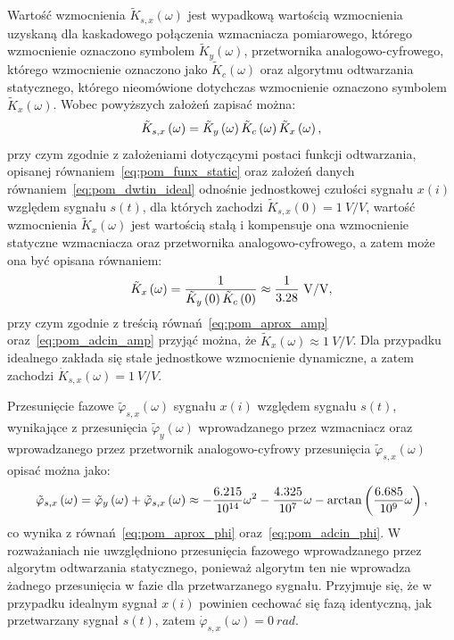 Wartość wzmocnienia $\tilde{K}_{s,x}(\omega)$ jest wypadkową wartością wzmocnienia uzyskaną dla kaskadowego połączenia wzmacniacza pomiarowego, którego wzmocnienie oznaczono symbolem $\tilde{K}_{y}(\omega)$, przetwornika analogowo-cyfrowego, którego wzmocnienie oznaczono jako $\tilde{K}_{c}(\omega)$ oraz algorytmu odtwarzania statycznego, którego nieomówione dotychczas wzmocnienie oznaczono symbolem $\tilde{K}_{x}(\omega)$. Wobec powyższych założeń zapisać można:
\begin{equation}
\tilde{K}_{s,x} \left(\omega\right) = \tilde{K}_{y} \left(\omega\right) \tilde{K}_{c} \left(\omega\right) \tilde{K}_{x} \left(\omega\right) \label{eq:pom_dwtin_amp},
\end{equation}
przy czym zgodnie z założeniami dotyczącymi postaci funkcji odtwarzania, opisanej równaniem~\eqref{eq:pom_funx_static} oraz założeń danych równaniem~\eqref{eq:pom_dwtin_ideal} odnośnie jednostkowej czułości sygnału $x(i)$ względem sygnału $s(t)$, dla których zachodzi $\tilde{K}_{s,x}(0) = \qty{1}{V \per V}$, wartość wzmocnienia $\tilde{K}_{x}(\omega)$ jest wartością stałą i kompensuje ona wzmocnienie statyczne wzmacniacza oraz przetwornika analogowo-cyfrowego, a zatem może ona być opisana równaniem:
\begin{equation}
\tilde{K}_{x} \emb{\omega} = \frac{1}{\tilde{K}_{y} \emb{0} \tilde{K}_{c} \emb{0}} \approx \frac{1}{3.28}~\unit{V \per V} \label{eq:pom_dwtin_ampnorm},
\end{equation}
przy czym zgodnie z treścią równań~\eqref{eq:pom_aprox_amp} oraz~\eqref{eq:pom_adcin_amp} przyjąć można, że $\tilde{K}_{x}(\omega) \approx \qty{1}{V \per V}$. Dla przypadku idealnego zakłada się stałe jednostkowe wzmocnienie dynamiczne, a zatem zachodzi $\dot{K}_{s,x}(\omega) = \qty{1}{V \per V}$.

Przesunięcie fazowe $\tilde{\varphi}_{s,x}(\omega)$ sygnału $x(i)$ względem sygnału $s(t)$, wynikające z przesunięcia $\tilde{\varphi}_{y}(\omega)$ wprowadzanego przez wzmacniacz oraz wprowadzanego przez przetwornik analogowo-cyfrowy przesunięcia $\tilde{\varphi}_{s,x}(\omega)$ opisać można jako:
\begin{equation}
\tilde{\varphi}_{s,x} \left(\omega\right) = \tilde{\varphi}_{y} \left(\omega\right) + \tilde{\varphi}_{s,x} \left(\omega\right) \approx -\frac{6.215}{\num{e14}} \omega^{2} - \frac{4.325}{\num{e07}} \omega - \arctan \left(\frac{6.685}{\num{e9}} \omega\right) \label{eq:pom_dwtin_phi},
\end{equation}
co wynika z równań~\eqref{eq:pom_aprox_phi} oraz~\eqref{eq:pom_adcin_phi}. W rozważaniach nie uwzględniono przesunięcia fazowego wprowadzanego przez algorytm odtwarzania statycznego, ponieważ algorytm ten nie wprowadza żadnego przesunięcia w fazie dla przetwarzanego sygnału. Przyjmuje się, że w przypadku idealnym sygnał $x(i)$ powinien cechować się fazą identyczną, jak przetwarzany sygnał $s(t)$, zatem $\dot{\varphi}_{s,x}(\omega) = \qty{0}{rad}$.

